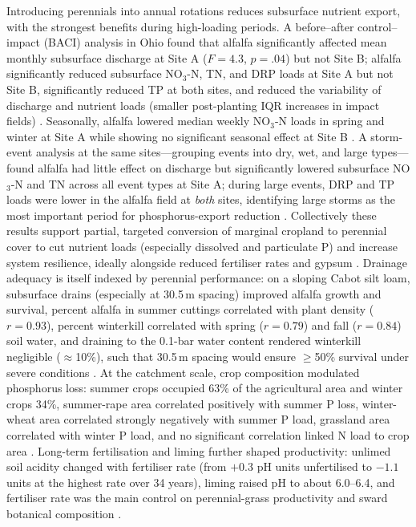 Introducing perennials into annual rotations reduces subsurface nutrient export, with the strongest benefits during high-loading periods. A before--after control--impact (BACI) analysis in Ohio found that alfalfa significantly affected mean monthly subsurface discharge at Site A ($F=4.3$, $p=.04$) but not Site B; alfalfa significantly reduced subsurface NO$_3$-N, TN, and DRP loads at Site A but not Site B, significantly reduced TP at both sites, and reduced the variability of discharge and nutrient loads (smaller post-planting IQR increases in impact fields) \parencite{Arrueta2022}. Seasonally, alfalfa lowered median weekly NO$_3$-N loads in spring and winter at Site A while showing no significant seasonal effect at Site B \parencite{Arrueta2022}. A storm-event analysis at the same sites---grouping events into dry, wet, and large types---found alfalfa had little effect on discharge but significantly lowered subsurface NO$_3$-N and TN across all event types at Site A; during large events, DRP and TP loads were lower in the alfalfa field at \emph{both} sites, identifying large storms as the most important period for phosphorus-export reduction \parencite{Arrueta2025}. Collectively these results support partial, targeted conversion of marginal cropland to perennial cover to cut nutrient loads (especially dissolved and particulate P) and increase system resilience, ideally alongside reduced fertiliser rates and gypsum \parencite{Arrueta2022,Arrueta2025}. Drainage adequacy is itself indexed by perennial performance: on a sloping Cabot silt loam, subsurface drains (especially at 30.5\,m spacing) improved alfalfa growth and survival, percent alfalfa in summer cuttings correlated with plant density ($r=0.93$), percent winterkill correlated with spring ($r=0.79$) and fall ($r=0.84$) soil water, and draining to the 0.1-bar water content rendered winterkill negligible ($\approx$10\%), such that 30.5\,m spacing would ensure $\geq$50\% survival under severe conditions \parencite{BENOIT1967}. At the catchment scale, crop composition modulated phosphorus loss: summer crops occupied 63\% of the agricultural area and winter crops 34\%, summer-rape area correlated positively with summer P loss, winter-wheat area correlated strongly negatively with summer P load, grassland area correlated with winter P load, and no significant correlation linked N load to crop area \parencite{DambenieceMigliniece2018}. Long-term fertilisation and liming further shaped productivity: unlimed soil acidity changed with fertiliser rate (from $+0.3$ pH units unfertilised to $-1.1$ units at the highest rate over 34 years), liming raised pH to about 6.0--6.4, and fertiliser rate was the main control on perennial-grass productivity and sward botanical composition \parencite{Vigovskis2016}.

